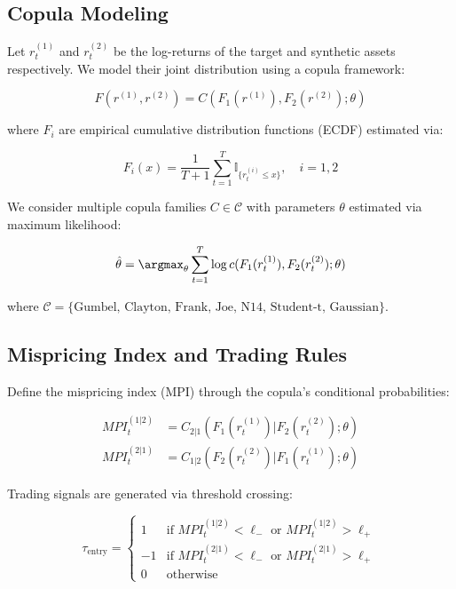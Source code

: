\subsection{Copula Modeling}
Let $r_t^{(1)}$ and $r_t^{(2)}$ be the log-returns of the target and synthetic assets respectively. We model their joint distribution using a copula framework:

\begin{equation}
F(r^{(1)}, r^{(2)}) = C(F_1(r^{(1)}), F_2(r^{(2)}); \theta)
\end{equation}

where $F_i$ are empirical cumulative distribution functions (ECDF) estimated via:

\begin{equation}
F_i(x) = \frac{1}{T+1}\sum_{t=1}^T \mathbb{I}_{\{r_t^{(i)} \leq x\}},\quad i=1,2
\end{equation}

We consider multiple copula families $C \in \mathcal{C}$ with parameters $\theta$ estimated via maximum likelihood:

\begin{equation}
\hat{\theta} = \argmax_{\theta} \sum_{t=1}^T \log c(F_1(r_t^{(1)}), F_2(r_t^{(2)}); \theta)
\end{equation}

where $\mathcal{C} = \{\text{Gumbel, Clayton, Frank, Joe, N14, Student-t, Gaussian}\}$.

\subsection{Mispricing Index and Trading Rules}
Define the mispricing index (MPI) through the copula's conditional probabilities:

\begin{align}
MPI_t^{(1|2)} &= C_{2|1}(F_1(r_t^{(1)})|F_2(r_t^{(2)}); \theta) \\
MPI_t^{(2|1)} &= C_{1|2}(F_2(r_t^{(2)})|F_1(r_t^{(1)}); \theta)
\end{align}

Trading signals are generated via threshold crossing:

\begin{equation}
\tau_{\text{entry}} = \begin{cases}
1 & \text{if } MPI_t^{(1|2)} < \ell_- \text{ or } MPI_t^{(1|2)} > \ell_+ \\
-1 & \text{if } MPI_t^{(2|1)} < \ell_- \text{ or } MPI_t^{(2|1)} > \ell_+ \\
0 & \text{otherwise}
\end{cases}
\end{equation}

